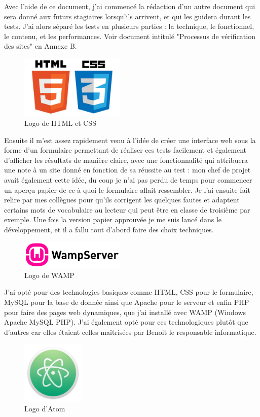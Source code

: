 \documentclass[report]{tnreport}
\begin{document}
Avec l’aide de ce document, j’ai commencé la rédaction d’un autre document qui sera donné aux futurs stagiaires lorsqu’ils arrivent, et qui les guidera durant les tests. J’ai alors séparé les tests en plusieurs parties : la technique, le fonctionnel, le contenu, et les performances. Voir document intitulé "Processus de vérification des sites" en Annexe B.
\begin{figure}
  \centering
  \includegraphics[width=5cm]{figures/html5css3}
  \caption{Logo de HTML et CSS}
  \label{fig:logo-html-css}
\end{figure}
Ensuite il m’est assez rapidement venu à l’idée de créer une interface web sous la forme d’un formulaire permettant de réaliser ces tests facilement et également d’afficher les résultats de manière claire, avec une fonctionnalité qui attribuera une note à un site donné en fonction de sa réussite au test : mon chef de projet avait également cette idée, du coup je n’ai pas perdu de temps pour commencer un aperçu papier de ce à quoi le formulaire allait ressembler. 
Je l’ai ensuite fait relire par mes collègues pour qu’ils corrigent les quelques fautes et adaptent certains mots de vocabulaire au lecteur qui peut être en classe de troisième par exemple.
Une fois la version papier approuvée je me suis lancé dans le développement, et il a fallu tout d’abord faire des choix techniques.
\begin{figure}
  \centering
  \includegraphics[width=5cm]{figures/wamp}
  \caption{Logo de WAMP}
  \label{fig:logo-wamp}
\end{figure}
J’ai opté pour des technologies basiques comme HTML, CSS pour le formulaire, MySQL pour la base de donnée ainsi que Apache pour le serveur et enfin PHP pour faire des pages web dynamiques, que j’ai installé avec WAMP (Windows Apache MySQL PHP).
J’ai également opté pour ces technologiques plutôt que d’autres car elles étaient celles maîtrisées par Benoit le responsable informatique.
\begin{figure}
  \centering
  \includegraphics[width=3cm]{figures/atom}
  \caption{Logo d'Atom}
  \label{fig:logo-html-css}
\end{figure}
\end{document}
